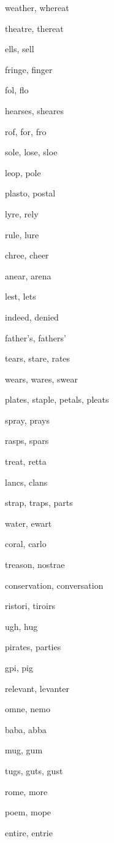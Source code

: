     \item weather, whereat
    \item theatre, thereat
    \item ells, sell
    \item fringe, finger
    \item fol, flo
    \item hearses, sheares
    \item rof, for, fro
    \item sole, lose, sloe
    \item leop, pole
    \item plasto, postal
    \item lyre, rely
    \item rule, lure
    \item chree, cheer
    \item anear, arena
    \item lest, lets
    \item indeed, denied
    \item father's, fathers'
    \item tears, stare, rates
    \item wears, wares, swear
    \item plates, staple, petals, pleats
    \item spray, prays
    \item rasps, spars
    \item treat, retta
    \item lancs, clans
    \item strap, traps, parts
    \item water, ewart
    \item coral, carlo
    \item treason, nostrae
    \item conservation, conversation
    \item ristori, tiroirs
    \item ugh, hug
    \item pirates, parties
    \item gpi, pig
    \item relevant, levanter
    \item omne, nemo
    \item baba, abba
    \item mug, gum
    \item tugs, guts, gust
    \item rome, more
    \item poem, mope
    \item entire, entrie
